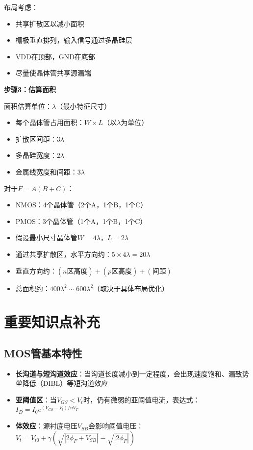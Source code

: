 \documentclass[UTF8,12pt,a4paper]{ctexart}
\begin{document}
布局考虑：
\begin{itemize}
    \item 共享扩散区以减小面积
    \item 栅极垂直排列，输入信号通过多晶硅层
    \item VDD在顶部，GND在底部
    \item 尽量使晶体管共享源漏端
\end{itemize}

\textbf{步骤3：估算面积}

面积估算单位：$\lambda$（最小特征尺寸）

\begin{itemize}
    \item 每个晶体管占用面积：$W \times L$（以$\lambda$为单位）
    \item 扩散区间距：$3\lambda$
    \item 多晶硅宽度：$2\lambda$
    \item 金属线宽度和间距：$3\lambda$
\end{itemize}

对于$F = A(B+C)$：
\begin{itemize}
    \item NMOS：4个晶体管（2个A，1个B，1个C）
    \item PMOS：3个晶体管（1个A，1个B，1个C）
    \item 假设最小尺寸晶体管$W = 4\lambda$，$L = 2\lambda$
    \item 通过共享扩散区，水平方向约：$5 \times 4\lambda = 20\lambda$
    \item 垂直方向约：$(n区高度) + (p区高度) + (间距)$
    \item 总面积约：$400\lambda^2 \sim 600\lambda^2$（取决于具体布局优化）
\end{itemize}

\section*{重要知识点补充}

\subsection*{MOS管基本特性}

\begin{itemize}
    \item \textbf{长沟道与短沟道效应}：当沟道长度减小到一定程度，会出现速度饱和、漏致势垒降低（DIBL）等短沟道效应
    \item \textbf{亚阈值区}：当$V_{GS} < V_t$时，仍有微弱的亚阈值电流，表达式：$I_D = I_0 e^{(V_{GS}-V_t)/nV_T}$
    \item \textbf{体效应}：源衬底电压$V_{SB}$会影响阈值电压：$V_t = V_{t0} + \gamma(\sqrt{|2\phi_F + V_{SB}|} - \sqrt{|2\phi_F|})$
\end{itemize}
\end{document}
